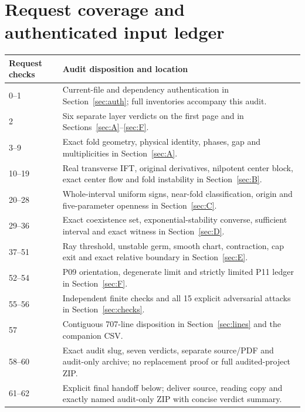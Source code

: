 \documentclass[11pt]{article}
\begin{document}
\section{Request coverage and authenticated input ledger}
\label{sec:coverage}
\begin{longtable}{@{}p{}p{}@{}}
\toprule Request checks&Audit disposition and location\\\midrule\endhead
0--1&Current-file and dependency authentication in Section~\ref{sec:auth}; full inventories accompany this audit.\\
2&Six separate layer verdicts on the first page and in Sections~\ref{sec:A}--\ref{sec:F}.\\
3--9&Exact fold geometry, physical identity, phases, gap and multiplicities in Section~\ref{sec:A}.\\
10--19&Real transverse IFT, original derivatives, nilpotent center block, exact center flow and fold instability in Section~\ref{sec:B}.\\
20--28&Whole-interval uniform signs, near-fold classification, origin and five-parameter openness in Section~\ref{sec:C}.\\
29--36&Exact coexistence set, exponential-stability converse, sufficient interval and exact witness in Section~\ref{sec:D}.\\
37--51&Ray threshold, unstable germ, smooth chart, contraction, cap exit and exact relative boundary in Section~\ref{sec:E}.\\
52--54&P09 orientation, degenerate limit and strictly limited P11 ledger in Section~\ref{sec:F}.\\
55--56&Independent finite checks and all 15 explicit adversarial attacks in Section~\ref{sec:checks}.\\
57&Contiguous 707-line disposition in Section~\ref{sec:lines} and the companion CSV.\\
58--60&Exact audit slug, seven verdicts, separate source/PDF and audit-only archive; no replacement proof or full audited-project ZIP.\\
61--62&Explicit final handoff below; deliver source, reading copy and exactly named audit-only ZIP with concise verdict summary.\\
\bottomrule
\end{longtable}
\end{document}
